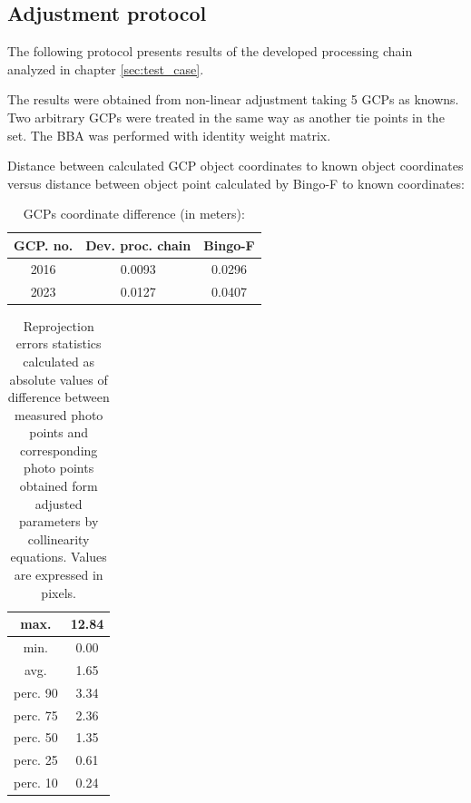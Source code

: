 \documentclass[a4paper,12pt]{article}
\begin{document}
\begin{appendices}


\section{Adjustment protocol}
\label{sec:adj_protocol}

The following protocol presents results of the developed processing chain
analyzed in chapter \ref{sec:test_case}.

The results were  obtained from non-linear adjustment taking 5 GCPs as knowns.
Two arbitrary GCPs were treated in the same way as another tie points 
in the set. The BBA was performed with identity weight matrix. 

Distance between calculated GCP object coordinates  to
 known object coordinates versus distance between object point calculated by  Bingo-F 
 to known coordinates:
\begin{center}
\footnotesize
{}
\begin{longtable}{| c || c | c |}
\caption{GCPs coordinate difference (in meters):}
\\ \hline
\label{table:comparison}
GCP. no. & Dev. proc. chain &  Bingo-F \\ \hline 
  2016  &    0.0093  &  0.0296 \\ \hline 
  2023 &     0.0127  &   0.0407 \\ \hline 
  \hline 
\end{longtable}
\end{center}


\begin{center}
\footnotesize
{}
\begin{longtable}{| c | c |}
\caption{Reprojection errors statistics calculated 
as absolute values of difference between 
measured photo points and  corresponding photo points 
obtained form adjusted parameters by collinearity equations.
Values are expressed in pixels.}
\label{table:rep_e_results}
\\ \hline
max. & 12.84 \\ \hline 
min. & 0.00 \\ \hline 
avg.  & 1.65 \\ \hline 
perc. 90  & 3.34 \\ \hline 
perc. 75  & 2.36 \\ \hline 
perc. 50  & 1.35 \\ \hline 
perc. 25  & 0.61 \\ \hline 
perc. 10  & 0.24 \\ \hline 
\hline 
\end{longtable}
\end{center}


\end{appendices}
\end{document}
